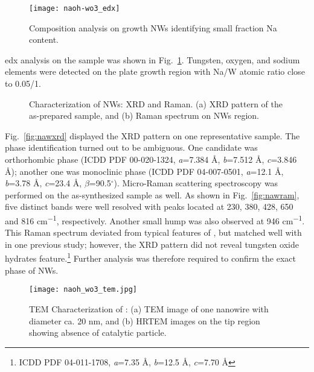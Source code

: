 \begin{figure}[htb]
\centering
\texttt{[image: naoh-wo3\_edx]}
\caption[Composition analysis on   growth NWs identifying small fraction Na content]{Composition analysis on   growth NWs identifying small fraction Na content.}
\label{fig:naohwedx}
\end{figure}
\gls{edx} analysis on the   sample was shown in Fig.~\ref{fig:naohwedx}. Tungsten, oxygen, and sodium elements were detected on the plate growth region with Na/W atomic ratio close to 0.05/1. 
\begin{figure}[htb]
\centering
{}\hspace{0.04\textwidth}
\caption[Characterization of   NWs: XRD and Raman]{Characterization of   NWs: XRD and Raman. (a) XRD pattern of the as-prepared sample, and (b) Raman spectrum on NWs region.}
\label{fig:naohwxrd}
\end{figure}
Fig.~\ref{fig:nawxrd} displayed the XRD pattern on one representative sample. The phase identification turned out to be ambiguous. One candidate was orthorhombic  phase (ICDD PDF 00-020-1324, \emph{a}=7.384 \si{\angstrom}, \emph{b}=7.512 \si{\angstrom}, \emph{c}=3.846 \si{\angstrom}); another one was monoclinic  phase (ICDD PDF 04-007-0501, \emph{a}=12.1 \si{\angstrom}, \emph{b}=3.78 \si{\angstrom}, \emph{c}=23.4 \si{\angstrom}, $\beta$=90.5$^\circ$). Micro-Raman scattering spectroscopy was performed on the as-synthesized sample as well. As shown in Fig.~\ref{fig:nawram}, five distinct bands were well resolved with peaks located at 230, 380, 428, 650 and 816 \si{cm^{-1}}, respectively. Another small hump was also observed at 946 \si{cm^{-1}}. This Raman spectrum deviated from typical features of ,\cite{Salje1975a,Dixit1986} but matched well with  in one previous study;\cite{Daniel1987} however, the XRD pattern did not reveal tungsten oxide hydrates feature.\footnote{ICDD PDF 04-011-1708, \emph{a}=7.35 \si{\angstrom}, \emph{b}=12.5 \si{\angstrom}, \emph{c}=7.70 \si{\angstrom}} Further analysis was therefore required to confirm the exact phase of   NWs.\cite{Azimirad2009a} 

\begin{figure}[htb]
\centering
\texttt{[image: naoh\_wo3\_tem.jpg]}
\caption[Characterization of  : TEM]{TEM Characterization of  : (a) TEM image of one nanowire with diameter ca. 20 nm, and (b) HRTEM images on the tip region showing absence of catalytic particle.}
\label{fig:naohwtem}
\end{figure}

